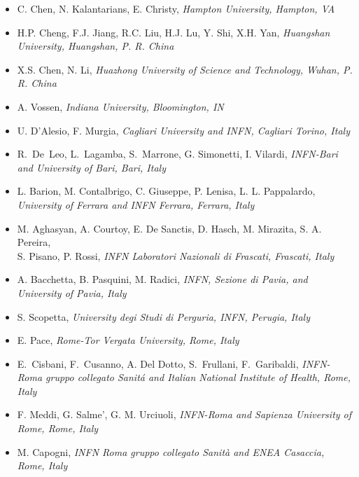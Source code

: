 \begin{itemize}
\item C. Chen, N. Kalantarians, E. Christy,  
\emph{Hampton University, Hampton, VA}
 
\item H.P. Cheng, F.J. Jiang, R.C. Liu, H.J. Lu, Y. Shi, X.H. Yan, 
\emph{Huangshan University, Huangshan, P. R. China}
 
\item X.S. Chen, N. Li, 
\emph{Huazhong University of Science and Technology, Wuhan, P. R. China}
 
\item A. Vossen, 
\emph{Indiana University, Bloomington, IN}
  
\item U. D'Alesio, F. Murgia,  
\emph{Cagliari University and INFN, Cagliari Torino, Italy}
 
\item 
R.~De~Leo, L.~Lagamba, S.~Marrone, G. Simonetti, I. Vilardi, 
\emph{INFN-Bari and University of Bari, Bari, Italy}  
 
\item L. Barion, M. Contalbrigo, C. Giuseppe, P. Lenisa, L. L. Pappalardo,
\emph{University of Ferrara and INFN Ferrara, Ferrara, Italy}
 
\item M. Aghasyan, A. Courtoy,
 E. De Sanctis, D. Hasch, M. Mirazita,
 S. A. Pereira, \\ S. Pisano, P. Rossi,  
\emph{INFN Laboratori Nazionali di Frascati, Frascati, Italy}
 
\item A. Bacchetta, B. Pasquini, M. Radici,
\emph{INFN, Sezione di Pavia, and University of Pavia, Italy}
 
\item S. Scopetta, 
\emph{University degi Studi di Perguria, INFN, Perugia, Italy}
 
\item E. Pace, 
\emph{Rome-Tor Vergata University, Rome, Italy}
 
\item E.~Cisbani, F.~Cusanno, A. Del Dotto, S.~Frullani, F.~Garibaldi, 
\emph{INFN-Roma gruppo collegato Sanit\'a and Italian National Institute of
Health, Rome, Italy}
 
\item F. Meddi, G. Salme', G. M. Urciuoli, 
\emph{INFN-Roma and Sapienza University of Rome, Rome, Italy}
 
\item M. Capogni,  
\emph{INFN Roma gruppo collegato Sanit\`a and ENEA Casaccia, Rome, Italy}
  

\end{itemize}
